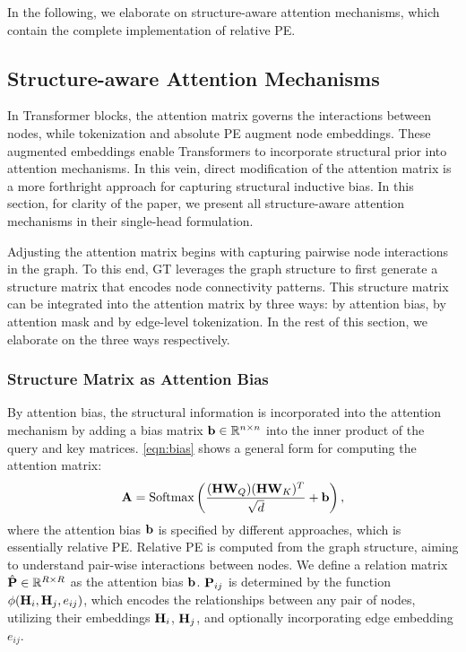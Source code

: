 In the following, we elaborate on structure-aware attention mechanisms, which contain the complete implementation of relative PE. 
\subsection{Structure-aware Attention Mechanisms}
\label{architecture:attention}
In Transformer blocks, the attention matrix governs the interactions between nodes, while tokenization and absolute PE augment node embeddings. 
These augmented embeddings enable Transformers to incorporate structural prior into attention mechanisms. 
In this vein, direct modification of the attention matrix is a more forthright   approach for capturing  structural inductive bias. In this section, for clarity of the paper, we present all structure-aware attention mechanisms in their single-head formulation.

Adjusting the attention matrix begins with  capturing pairwise node interactions in the graph. To this end, GT leverages the graph structure to first generate a structure matrix that encodes node connectivity patterns. This structure matrix can be integrated into the attention matrix by three ways: by attention bias, by attention mask and by edge-level tokenization. 
In the rest of this section, we elaborate on the three ways respectively.
\subsubsection{Structure Matrix as Attention Bias}
By attention bias, the structural information is incorporated into the attention mechanism by adding a bias matrix $\mathbf{b} \in \mathbb{R}^{n\times n}$ into the inner product of the query and key matrices. 
\cref{eqn:bias} shows a general form for computing the attention matrix:
\begin{align}
\label{eqn:bias}
    \mathbf{A}=\text{Softmax}\left(\frac{(\mathbf{H}\mathbf{W}_{Q})(\mathbf{H}\mathbf{W}_{K})^T}{\sqrt{d}} + \mathbf{b}\right),
\end{align}
where the attention bias $\mathbf{b}$ is specified by different approaches, which is essentially relative PE. 
Relative PE is computed from the graph structure, aiming to understand pair-wise interactions between nodes. We define a relation matrix $\hat{\mathbf{P}} \in \mathbb{R}^{R\times R}$ as the attention bias $\mathbf{b}$. 
$\mathbf{P}_{ij}$ is determined by the function $\phi(\mathbf{H}_i, \mathbf{H}_j, e_{ij})$, which encodes the relationships between any pair of nodes, utilizing their embeddings $\mathbf{H}_i$, $\mathbf{H}_j$, and optionally incorporating edge embedding $e_{ij}$.

